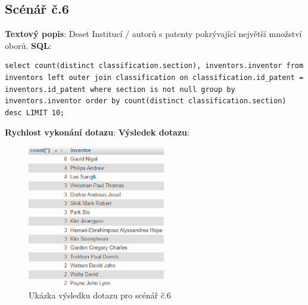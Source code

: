 \subsection{Scénář č.6}
\textbf{Textový popis}: Deset Institucí / autorů s patenty pokrývající největší množství oborů.
\newline
\textbf{SQL}: 
\begin{lstlisting}[label = {lst:elements_a}]
select count(distinct classification.section), inventors.inventor from inventors left outer join classification on classification.id_patent = inventors.id_patent where section is not null group by inventors.inventor order by count(distinct classification.section) desc LIMIT 10;
\end{lstlisting}
\textbf{Rychlost vykonání dotazu}: 
\newline
\textbf{Výsledek dotazu}:
\begin{figure}[H]
\centering
\includegraphics[width=6cm]{img/scenare/scenar_9}
\caption{Ukázka výsledku dotazu pro scénář č.6}
\label{fig:scenar6}
\end{figure}

